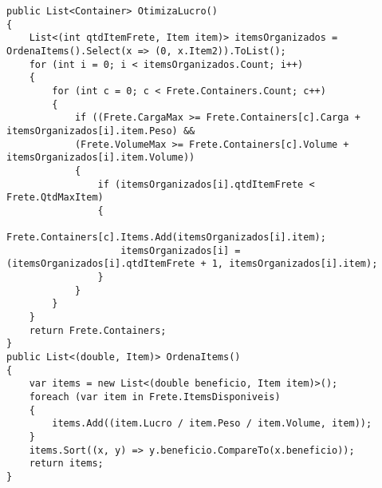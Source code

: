 \documentclass[12pt]{article}
\renewcommand{\_}{\kern-1.5pt\textunderscore\kern-1.5pt}
\begin{document}
\lstset{style=sharpc}
\begin{lstlisting}[basicstyle=\tiny]
public List<Container> OtimizaLucro()
{
	List<(int qtdItemFrete, Item item)> itemsOrganizados = OrdenaItems().Select(x => (0, x.Item2)).ToList();
	for (int i = 0; i < itemsOrganizados.Count; i++)
	{
		for (int c = 0; c < Frete.Containers.Count; c++)
		{
			if ((Frete.CargaMax >= Frete.Containers[c].Carga + itemsOrganizados[i].item.Peso) &&
			(Frete.VolumeMax >= Frete.Containers[c].Volume + itemsOrganizados[i].item.Volume))
			{
				if (itemsOrganizados[i].qtdItemFrete < Frete.QtdMaxItem)
				{
					Frete.Containers[c].Items.Add(itemsOrganizados[i].item);
					itemsOrganizados[i] = (itemsOrganizados[i].qtdItemFrete + 1, itemsOrganizados[i].item);
				}
			}
		}
	}
	return Frete.Containers;
}
public List<(double, Item)> OrdenaItems()
{
	var items = new List<(double beneficio, Item item)>();
	foreach (var item in Frete.ItemsDisponiveis)
	{
		items.Add((item.Lucro / item.Peso / item.Volume, item));
	}
	items.Sort((x, y) => y.beneficio.CompareTo(x.beneficio));
	return items;
}
\end{lstlisting}
\vspace{\baselineskip}

\printbibliography
\end{document}
